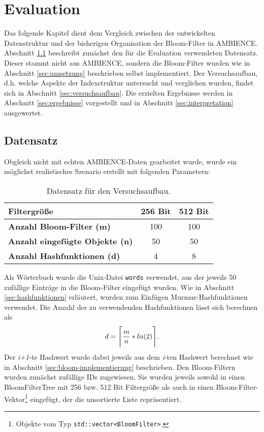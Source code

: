 \chapter{Evaluation}\label{ch:evaluation}
Das folgende Kapitel dient dem Vergleich zwischen der entwickelten Datenstruktur und der bisherigen Organisation der Bloom-Filter in AMBIENCE. Abschnitt \ref{sec:datensatz} beschreibt zunächst den für die Evaluation verwendeten Datensatz. Dieser stammt nicht aus AMBIENCE, sondern die Bloom-Filter wurden wie in Abschnitt \ref{sec:umsetzung} beschrieben selbst implementiert. Der Versuchsaufbau, d.h. welche Aspekte der Indexstruktur untersucht und verglichen wurden, findet sich in Abschnitt \ref{sec:versuchsaufbau}. Die erzielten Ergebnisse werden in Abschnitt \ref{sec:ergebnisse} vorgestellt und in Abschnitt \ref{sec:interpretation} ausgewertet. 
\section{Datensatz}\label{sec:datensatz}
Obgleich nicht mit echten AMBIENCE-Daten gearbeitet wurde, wurde ein möglichst realistisches Szenario erstellt mit folgenden Parametern:
\begin{center}
\begin{table}[htbp]
{\small
\begin{center}
\begin{tabular}[center]{lcc}
\toprule
\textbf{Filtergröße} & 256 Bit & 512 Bit\\
\midrule
\textbf{Anzahl Bloom-Filter (m)} & 100 & 100\\
\midrule
\textbf{Anzahl eingefügte Objekte (n)} & 50 & 50\\
\midrule
\textbf{Anzahl Hashfunktionen (d)} & 4 & 8\\
\bottomrule
\end{tabular}
\end{center}
} %
\caption[Datensatz für den Versuchsaufbau]{Datensatz für den Versuchsaufbau.\label{tab:Datensatz}}
\end{table}
\end{center}
Als Wörterbuch wurde die Unix-Datei \texttt{words} verwendet, aus der jeweils 50 zufällige Einträge in die Bloom-Filter eingefügt wurden. Wie in Abschnitt \ref{sec:hashfunktionen} erläutert, wurden zum Einfügen Murmur-Hashfunktionen verwendet. Die Anzahl der zu verwendenden Hashfunktionen lässt sich berechnen als 
\[d = \Ceil[\Bigg]{\frac{m}{n} * ln(2)}.\]
\noindent
Der \textit{i+1}-te Hashwert wurde dabei jeweils aus dem \textit{i}-ten Hashwert berechnet wie in Abschnitt \ref{sec:bloom-implementierung} beschrieben. Den Bloom-Filtern wurden zunächst zufällige IDs zugewiesen. Sie wurden jeweils sowohl in einen BloomFilterTree mit 256 bzw. 512 Bit Filtergröße als auch in einen Bloom-Filter-Vektor\footnote{Objekte vom Typ \texttt{std::vector<BloomFilter>}.} eingefügt, der die unsortierte Liste repräsentiert.
